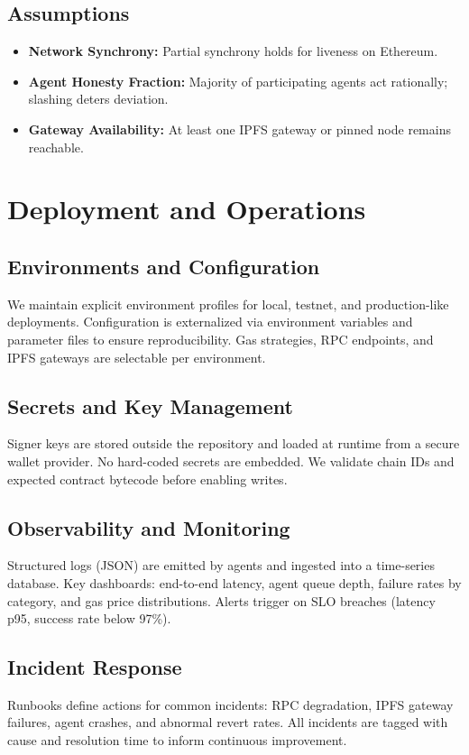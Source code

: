\subsection{Assumptions}
\begin{itemize}
    \item \textbf{Network Synchrony:} Partial synchrony holds for liveness on Ethereum.
    \item \textbf{Agent Honesty Fraction:} Majority of participating agents act rationally; slashing deters deviation.
    \item \textbf{Gateway Availability:} At least one IPFS gateway or pinned node remains reachable.
\end{itemize}

\section{Deployment and Operations}

\subsection{Environments and Configuration}
We maintain explicit environment profiles for local, testnet, and production-like deployments. Configuration is externalized via environment variables and parameter files to ensure reproducibility. Gas strategies, RPC endpoints, and IPFS gateways are selectable per environment.

\subsection{Secrets and Key Management}
Signer keys are stored outside the repository and loaded at runtime from a secure wallet provider. No hard-coded secrets are embedded. We validate chain IDs and expected contract bytecode before enabling writes.

\subsection{Observability and Monitoring}
Structured logs (JSON) are emitted by agents and ingested into a time-series database. Key dashboards: end-to-end latency, agent queue depth, failure rates by category, and gas price distributions. Alerts trigger on SLO breaches (latency p95, success rate below 97\%).

\subsection{Incident Response}
Runbooks define actions for common incidents: RPC degradation, IPFS gateway failures, agent crashes, and abnormal revert rates. All incidents are tagged with cause and resolution time to inform continuous improvement.

